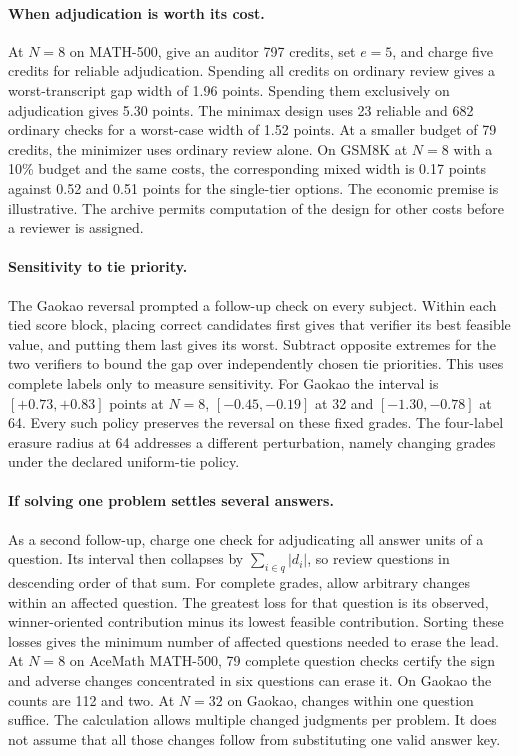 \documentclass[10pt,letterpaper]{article}
\begin{document}
\paragraph{When adjudication is worth its cost.}
At $N=8$ on MATH-500, give an auditor 797 credits, set $e=5$, and charge five credits for reliable adjudication. Spending all credits on ordinary review gives a worst-transcript gap width of 1.96 points. Spending them exclusively on adjudication gives 5.30 points. The minimax design uses 23 reliable and 682 ordinary checks for a worst-case width of 1.52 points. At a smaller budget of 79 credits, the minimizer uses ordinary review alone. On GSM8K at $N=8$ with a 10\% budget and the same costs, the corresponding mixed width is 0.17 points against 0.52 and 0.51 points for the single-tier options. The economic premise is illustrative. The archive permits computation of the design for other costs before a reviewer is assigned.


\paragraph{Sensitivity to tie priority.}
The Gaokao reversal prompted a follow-up check on every subject. Within each tied score block, placing correct candidates first gives that verifier its best feasible value, and putting them last gives its worst. Subtract opposite extremes for the two verifiers to bound the gap over independently chosen tie priorities. This uses complete labels only to measure sensitivity. For Gaokao the interval is $[+0.73,+0.83]$ points at $N=8$, $[-0.45,-0.19]$ at 32 and $[-1.30,-0.78]$ at 64. Every such policy preserves the reversal on these fixed grades. The four-label erasure radius at 64 addresses a different perturbation, namely changing grades under the declared uniform-tie policy.

\paragraph{If solving one problem settles several answers.}
As a second follow-up, charge one check for adjudicating all answer units of a question. Its interval then collapses by $\sum_{i\in q}|d_i|$, so review questions in descending order of that sum. For complete grades, allow arbitrary changes within an affected question. The greatest loss for that question is its observed, winner-oriented contribution minus its lowest feasible contribution. Sorting these losses gives the minimum number of affected questions needed to erase the lead. At $N=8$ on AceMath MATH-500, 79 complete question checks certify the sign and adverse changes concentrated in six questions can erase it. On Gaokao the counts are 112 and two. At $N=32$ on Gaokao, changes within one question suffice. The calculation allows multiple changed judgments per problem. It does not assume that all those changes follow from substituting one valid answer key.
\end{document}
